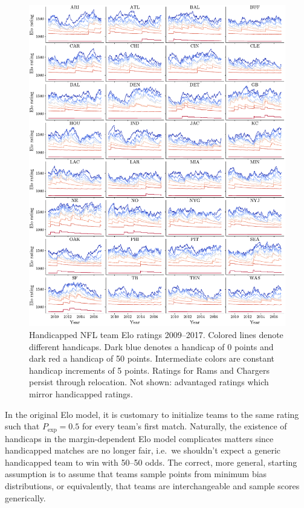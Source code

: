 \documentclass[aps,prc,reprint,amsmath,superscriptaddress,nofootinbib]{revtex4-1}
\begin{document}
\begin{figure}
  \includegraphics{team_history}
  \caption{\label{fig:history} Handicapped NFL team Elo ratings 2009--2017. Colored lines denote different handicaps. Dark blue denotes a handicap of 0 points and dark red a handicap of 50 points. Intermediate colors are constant handicap increments of 5 points. Ratings for Rams and Chargers persist through relocation. Not shown: advantaged ratings which mirror handicapped ratings.}
\end{figure}

In the original Elo model, it is customary to initialize teams to the same rating such that $P_\text{exp} = 0.5$ for every team's first match.
Naturally, the existence of handicaps in the margin-dependent Elo model complicates matters since handicapped matches are no longer fair, i.e.\ we shouldn't expect a generic handicapped team to win with 50--50 odds.
The correct, more general, starting assumption is to assume that teams sample points from minimum bias distributions, or equivalently, that teams are interchangeable and sample scores generically.
\end{document}
